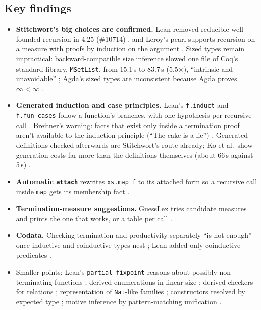 \documentclass[11pt,a4paper]{article}
\newcommand{\code}[1]{\texttt{#1}}
\begin{document}
\subsection{Key findings}
\begin{itemize}
  \item \textbf{Stitchwort's big choices are confirmed.} Lean removed reducible well-founded
    recursion in 4.25 (\#10714) \cite{leanreleases}, and Leroy's pearl supports recursion on a
    measure with proofs by induction on the argument \cite{leroy2024wf}. Sized types remain
    impractical: backward-compatible size inference slowed one file of Coq's standard library,
    \code{MSetList}, from 15.1\,s to 83.7\,s (5.5$\times$), ``intrinsic and unavoidable''
    \cite{chan2023sized}; Agda's sized types are inconsistent because Agda proves
    $\infty < \infty$ \cite{laarakker2026large}.
  \item \textbf{Generated induction and case principles.} Lean's \code{f.induct} and
    \code{f.fun\_cases} follow a function's branches, with one hypothesis per recursive call
    \cite{lean2026funind}. Breitner's warning: facts that exist only inside a termination proof
    aren't available to the induction principle (``The cake is a lie'')
    \cite{breitner2025extrinsic}. Generated definitions checked afterwards are Stitchwort's
    route already; Ko et al.\ show generation costs far more than the definitions
    themselves (about 66\,s against 5\,s) \cite{ko2022reflection,escot2022generic}.
  \item \textbf{Automatic \code{attach}} rewrites \code{xs.map f} to its attached form so a
    recursive call inside \code{map} gets its membership fact \cite{lean2026preprocess}.
  \item \textbf{Termination-measure suggestions.} GuessLex tries candidate measures and
    prints the one that works, or a table per call \cite{lean2026guesslex}.
  \item \textbf{Codata.} Checking termination and productivity separately ``is not enough''
    once inductive and coinductive types nest \cite{hyvernat2025sizechange}; Lean added only
    coinductive predicates \cite{leanrecursive}.
  \item Smaller points: Lean's \code{partial\_fixpoint} reasons about possibly non-terminating
    functions \cite{leanrecursive}; derived enumerations in linear size
    \cite{mathlibderivefintype}; derived checkers for relations \cite{paraskevopoulou2022computing};
    representation of \code{Nat}-like families \cite{theocharis2025custom,idris2builtins};
    constructors resolved by expected type \cite{leandottedident,agda280changelog}; motive
    inference by pattern-matching unification \cite{richter2026pmu}.
\end{itemize}
\end{document}
